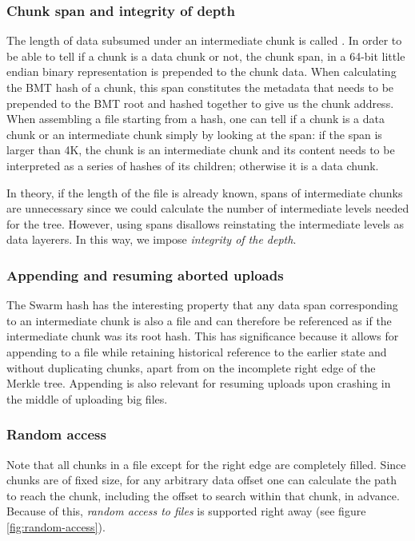  \subsubsection{Chunk span and integrity of depth}

The length of data subsumed under an intermediate chunk is called . In order to be able to tell if a chunk is a data chunk or not, the chunk span, in a 64-bit little endian binary representation is prepended to the chunk data.  When calculating the BMT hash of a chunk, this span constitutes the metadata that needs to be prepended to the BMT root and hashed together to give us the chunk address. When assembling a file starting from a hash, one can tell if a chunk is a data chunk or an intermediate chunk simply by looking at the span: if the span is larger than 4K, the chunk is an intermediate chunk and its content needs to be interpreted as a series of hashes of its children; otherwise it is a data chunk.

In theory, if the length of the file is already known, spans of intermediate chunks are unnecessary since we could calculate the number of intermediate levels needed for the tree. However, using spans disallows reinstating the intermediate levels as data layerers. In this way, we impose \emph{integrity of the depth}. 

\subsubsection{Appending and resuming aborted uploads}

The Swarm hash has the interesting property that any data span corresponding to an intermediate chunk is also a file and can therefore be referenced as if the intermediate chunk was its root hash. This has significance because it allows for appending to a file while retaining historical reference to the earlier state and without duplicating chunks, apart from on the incomplete right edge of the Merkle tree. Appending is also relevant for resuming uploads upon crashing in the middle of uploading big files.

\subsubsection{Random access}

Note that all chunks in a file except for the right edge are completely filled. Since chunks are of fixed size, for any arbitrary data offset one can calculate  the path to reach the chunk, including the offset to search within that chunk, in advance. Because of this, \emph{random access to files} is supported right away (see figure \ref{fig:random-access}).


